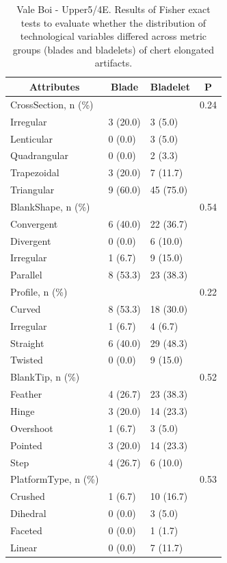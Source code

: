 \documentclass[12pt,twoside]{reedthesis}
\begin{document}
\begin{longtable}[t]{llll}
\caption{\label{tab:fisherelongVB2}Vale Boi - Upper5/4E. Results of Fisher exact tests to evaluate whether the distribution of technological variables differed across metric groups (blades and bladelets) of chert elongated artifacts.}\\
\toprule
\multicolumn{1}{c}{\textbf{Attributes}} & \multicolumn{1}{c}{\textbf{Blade}} & \multicolumn{1}{c}{\textbf{Bladelet}} & \multicolumn{1}{c}{\textbf{P}}\\
\midrule
CrossSection, n (\%) &  &  & 0.24\\
Irregular & 3 (20.0) & 3 (5.0) & \\
Lenticular & 0 (0.0) & 3 (5.0) & \\
Quadrangular & 0 (0.0) & 2 (3.3) & \\
Trapezoidal & 3 (20.0) & 7 (11.7) & \\
\addlinespace
Triangular & 9 (60.0) & 45 (75.0) & \\
BlankShape, n (\%) &  &  & 0.54\\
Convergent & 6 (40.0) & 22 (36.7) & \\
Divergent & 0 (0.0) & 6 (10.0) & \\
Irregular & 1 (6.7) & 9 (15.0) & \\
\addlinespace
Parallel & 8 (53.3) & 23 (38.3) & \\
Profile, n (\%) &  &  & 0.22\\
Curved & 8 (53.3) & 18 (30.0) & \\
Irregular & 1 (6.7) & 4 (6.7) & \\
Straight & 6 (40.0) & 29 (48.3) & \\
\addlinespace
Twisted & 0 (0.0) & 9 (15.0) & \\
BlankTip, n (\%) &  &  & 0.52\\
Feather & 4 (26.7) & 23 (38.3) & \\
Hinge & 3 (20.0) & 14 (23.3) & \\
Overshoot & 1 (6.7) & 3 (5.0) & \\
\addlinespace
Pointed & 3 (20.0) & 14 (23.3) & \\
Step & 4 (26.7) & 6 (10.0) & \\
PlatformType, n (\%) &  &  & 0.53\\
Crushed & 1 (6.7) & 10 (16.7) & \\
Dihedral & 0 (0.0) & 3 (5.0) & \\
\addlinespace
Faceted & 0 (0.0) & 1 (1.7) & \\
Linear & 0 (0.0) & 7 (11.7) & \\

\end{longtable}
\end{document}
